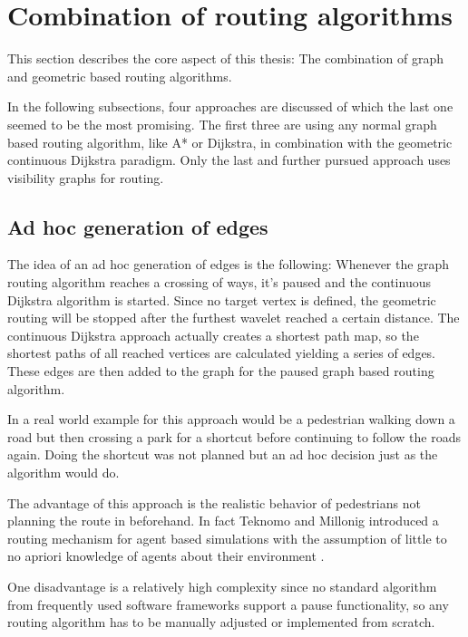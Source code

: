 

\section{Combination of routing algorithms}

	This section describes the core aspect of this thesis:
	The combination of graph and geometric based routing algorithms.
	
	In the following subsections, four approaches are discussed of which the last one seemed to be the most promising.
	The first three are using any normal graph based routing algorithm, like A* or Dijkstra, in combination with the geometric continuous Dijkstra paradigm.
	Only the last and further pursued approach uses visibility graphs for routing.
	
	\subsection{Ad hoc generation of edges}
	
		The idea of an ad hoc generation of edges is the following:
		Whenever the graph routing algorithm reaches a crossing of ways, it's paused and the continuous Dijkstra algorithm is started.
		Since no target vertex is defined, the geometric routing will be stopped after the furthest wavelet reached a certain distance.
		The continuous Dijkstra approach actually creates a shortest path map, so the shortest paths of all reached vertices are calculated yielding a series of edges.
		These edges are then added to the graph for the paused graph based routing algorithm.
		
		In a real world example for this approach would be a pedestrian walking down a road but then crossing a park for a shortcut before continuing to follow the roads again.
		Doing the shortcut was not planned but an ad hoc decision just as the algorithm would do.
		
		The advantage of this approach is the realistic behavior of pedestrians not planning the route in beforehand.
		In fact Teknomo and Millonig introduced a routing mechanism for agent based simulations with the assumption of little to no apriori knowledge of agents about their environment \cite{teknomo-millonig-routing}.
		
		One disadvantage is a relatively high complexity since no standard algorithm from frequently used software frameworks support a pause functionality, so any routing algorithm has to be manually adjusted or implemented from scratch.
		
